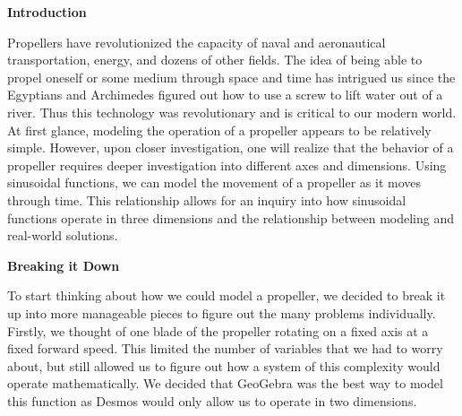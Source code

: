 


\hypersetup{
    colorlinks=true,
    linkcolor=blue,
    filecolor=magenta,      
    urlcolor=blue,
}

\noindent
\textbf{Introduction}

Propellers have revolutionized the capacity of naval and aeronautical transportation, energy, and dozens of other fields. The idea of being able to propel oneself or some medium through space and time has intrigued us since the Egyptians and Archimedes figured out how to use a screw to lift water out of a river. Thus this technology was revolutionary and is critical to our modern world. At first glance, modeling the operation of a propeller appears to be relatively simple. However, upon closer investigation, one will realize that the behavior of a propeller requires deeper investigation into different axes and dimensions. Using sinusoidal functions, we can model the movement of a propeller as it moves through time. This relationship allows for an inquiry into how sinusoidal functions operate in three dimensions and the relationship between modeling and real-world solutions.

\noindent
\textbf{Breaking it Down}

To start thinking about how we could model a propeller, we decided to break it up into more manageable pieces to figure out the many problems individually. Firstly, we thought of one blade of the propeller rotating on a fixed axis at a fixed forward speed. This limited the number of variables that we had to worry about, but still allowed us to figure out how a system of this complexity would operate mathematically. We decided that GeoGebra was the best way to model this function as Desmos would only allow us to operate in two dimensions. 

